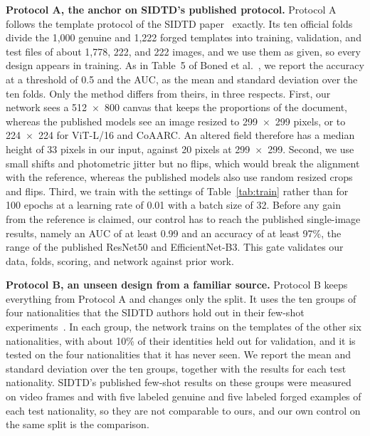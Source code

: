 \documentclass[12pt,a4paper]{article}
\begin{document}
\textbf{Protocol A, the anchor on SIDTD's published protocol.} Protocol A follows the template protocol of the SIDTD paper~\cite{boned2024sidtd} exactly. Its ten official folds divide the 1,000 genuine and 1,222 forged templates into training, validation, and test files of about 1,778, 222, and 222 images, and we use them as given, so every design appears in training. As in Table~5 of Boned et al.~\cite{boned2024sidtd}, we report the accuracy at a threshold of 0.5 and the AUC, as the mean and standard deviation over the ten folds. Only the method differs from theirs, in three respects. First, our network sees a 512~$\times$~800 canvas that keeps the proportions of the document, whereas the published models see an image resized to 299~$\times$~299 pixels, or to 224~$\times$~224 for ViT-L/16 and CoAARC. An altered field therefore has a median height of 33 pixels in our input, against 20 pixels at 299~$\times$~299. Second, we use small shifts and photometric jitter but no flips, which would break the alignment with the reference, whereas the published models also use random resized crops and flips. Third, we train with the settings of Table~\ref{tab:train} rather than for 100 epochs at a learning rate of 0.01 with a batch size of 32. Before any gain from the reference is claimed, our control has to reach the published single-image results, namely an AUC of at least 0.99 and an accuracy of at least 97\%, the range of the published ResNet50 and EfficientNet-B3. This gate validates our data, folds, scoring, and network against prior work.

\textbf{Protocol B, an unseen design from a familiar source.} Protocol B keeps everything from Protocol A and changes only the split. It uses the ten groups of four nationalities that the SIDTD authors hold out in their few-shot experiments~\cite{boned2024sidtd}. In each group, the network trains on the templates of the other six nationalities, with about 10\% of their identities held out for validation, and it is tested on the four nationalities that it has never seen. We report the mean and standard deviation over the ten groups, together with the results for each test nationality. SIDTD's published few-shot results on these groups were measured on video frames and with five labeled genuine and five labeled forged examples of each test nationality, so they are not comparable to ours, and our own control on the same split is the comparison.
\end{document}
